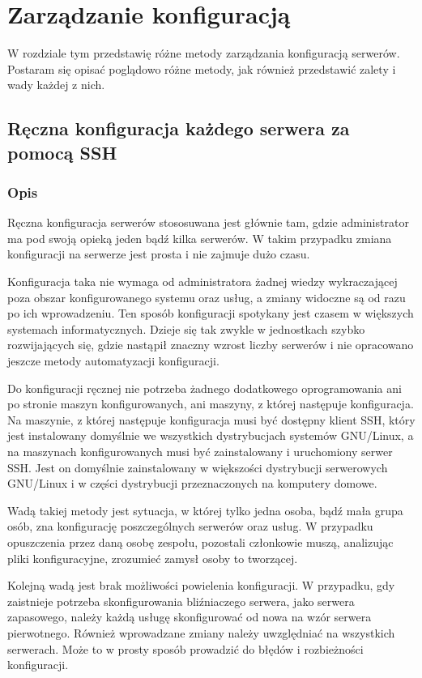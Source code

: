 \chapter{Zarządzanie konfiguracją}
W rozdziale tym przedstawię różne metody zarządzania konfiguracją serwerów. Postaram się opisać poglądowo różne metody, jak również przedstawić zalety i wady każdej z nich.
\section{Ręczna konfiguracja każdego serwera za pomocą SSH}
\subsection{Opis}
Ręczna konfiguracja serwerów stososuwana jest głównie tam, gdzie administrator ma pod swoją opieką jeden bądź kilka serwerów. W takim przypadku zmiana konfiguracji na serwerze jest prosta i nie zajmuje dużo czasu.

Konfiguracja taka nie wymaga od administratora żadnej wiedzy wykraczającej poza obszar konfigurowanego systemu oraz usług, a zmiany widoczne są od razu po ich wprowadzeniu.
Ten sposób konfiguracji spotykany jest czasem w większych systemach informatycznych.
Dzieje się tak zwykle w jednostkach szybko rozwijających się, gdzie nastąpił znaczny wzrost liczby serwerów i nie opracowano jeszcze metody automatyzacji konfiguracji.

Do konfiguracji ręcznej nie potrzeba żadnego dodatkowego oprogramowania ani po stronie maszyn konfigurowanych, ani maszyny, z której następuje konfiguracja.
Na maszynie, z której następuje konfiguracja musi być dostępny klient SSH, który jest instalowany domyślnie we wszystkich dystrybucjach systemów GNU/Linux, a na maszynach konfigurowanych musi być zainstalowany i uruchomiony serwer SSH. Jest on domyślnie zainstalowany w większości dystrybucji serwerowych GNU/Linux i w części dystrybucji przeznaczonych na komputery domowe.

Wadą takiej metody jest sytuacja, w której tylko jedna osoba, bądź mała grupa osób, zna konfigurację poszczególnych serwerów oraz usług.
W przypadku opuszczenia przez daną osobę zespołu, pozostali członkowie muszą, analizując pliki konfiguracyjne, zrozumieć zamysł osoby to tworzącej.

Kolejną wadą jest brak możliwości powielenia konfiguracji.
W przypadku, gdy zaistnieje potrzeba skonfigurowania bliźniaczego serwera, jako serwera zapasowego, należy każdą usługę skonfigurować od nowa na wzór serwera pierwotnego. Również wprowadzane zmiany należy uwzględniać na wszystkich serwerach.
Może to w prosty sposób prowadzić do błędów i rozbieżności konfiguracji.
